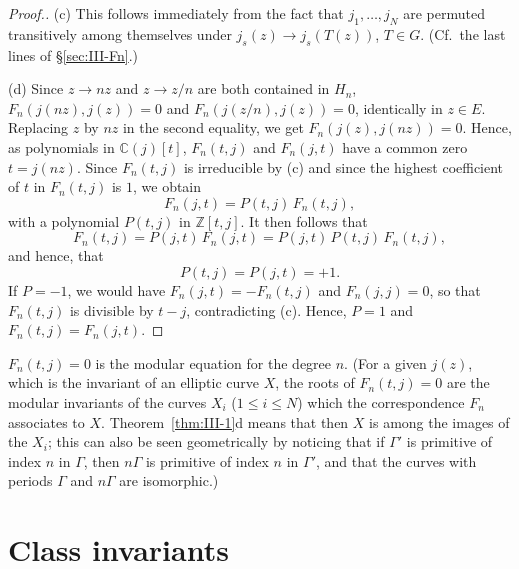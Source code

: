 \begin{proof}[Proof.]
(c) This follows immediately from the fact that $j_{1},\ldots,j_{N}$ are
permuted transitively among themselves under
$j_{s}(z)\longrightarrow j_{s}(T(z))$, $T\in G$. (Cf.\ the last lines of
§\ref{sec:III-Fn}.)

(d) Since $z\longrightarrow nz$ and $z\longrightarrow z/n$ are both
contained in $H_{n}$,
$F_{n}(j(nz),j(z))=0$ and $F_{n}(j(z/n),j(z))=0$, identically in
$z\in E$. Replacing $z$ by $nz$ in the second equality, we get
$F_{n}(j(z),j(nz))=0$. Hence, as polynomials in $\mathbb{C}(j)[t]$,
$F_{n}(t,j)$ and $F_{n}(j,t)$ have a common zero $t=j(nz)$. Since
$F_{n}(t,j)$ is irreducible by (c) and since the highest coefficient of
$t$ in $F_{n}(t,j)$ is $1$, we obtain
\[
F_{n}(j,t)=P(t,j)\,F_{n}(t,j),
\]
with a polynomial $P(t,j)$ in $\mathbb{Z}[t,j]$. It then follows that
\[
F_{n}(t,j)=P(j,t)\,F_{n}(j,t)=P(j,t)\,P(t,j)\,F_{n}(t,j),
\]
and hence, that
\[
P(t,j)=P(j,t)=+1.
\]
If $P=-1$, we would have $F_{n}(j,t)=-F_{n}(t,j)$ and $F_{n}(j,j)=0$, so
that $F_{n}(t,j)$ is divisible by $t-j$, contradicting (c). Hence, $P=1$
and $F_{n}(t,j)=F_{n}(j,t)$.
\end{proof}

$F_{n}(t,j)=0$ is the modular equation for the degree $n$. (For a given
$j(z)$, which is the invariant of an elliptic curve $X$, the roots of
$F_{n}(t,j)=0$ are the modular invariants of the curves $X_{i}$
($1\leq i\leq N$) which the correspondence $F_{n}$ associates to $X$.
Theorem~\ref{thm:III-1}d means that then $X$ is among the images of the
$X_{i}$; this can also be seen geometrically by noticing that if $\Gamma'$
is primitive of index $n$ in $\Gamma$, then $n\Gamma$ is primitive of
index $n$ in $\Gamma'$, and that the curves with periods $\Gamma$ and
$n\Gamma$ are isomorphic.)

\section{Class invariants}\label{sec:III-classinv}

